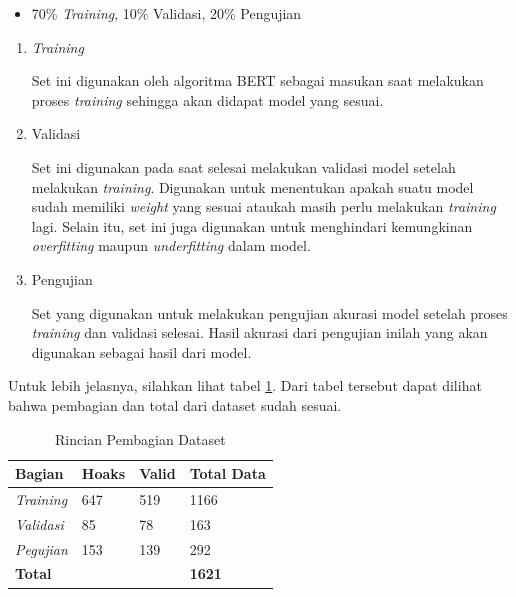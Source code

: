 \begin{itemize}
    \item 70\% \textit{Training}, 10\% Validasi, 20\% Pengujian
\end{itemize}

\begin{enumerate}
    \item \textit{Training}

          Set ini digunakan oleh algoritma BERT sebagai masukan saat melakukan proses \textit{training} sehingga akan didapat model yang sesuai.

    \item Validasi

          Set ini digunakan pada saat selesai melakukan validasi model setelah melakukan \textit{training}. Digunakan untuk menentukan apakah suatu model sudah memiliki \textit{weight} yang sesuai ataukah masih perlu melakukan \textit{training} lagi. Selain itu, set ini juga digunakan untuk menghindari kemungkinan \textit{overfitting} maupun \textit{underfitting} dalam model.

    \item Pengujian

          Set yang digunakan untuk melakukan pengujian akurasi model setelah proses \textit{training} dan validasi selesai. Hasil akurasi dari pengujian inilah yang akan digunakan sebagai hasil dari model.

\end{enumerate}

Untuk lebih jelasnya, silahkan lihat tabel \ref{tab:dataset_section}. Dari tabel tersebut dapat dilihat bahwa pembagian dan total dari dataset sudah sesuai.

\begin{table}[h]
    \caption{Rincian Pembagian Dataset}
    \label{tab:dataset_section}
    \centering
    \begin{tabular}{ | l | l | l | l | }
        \hline
        \textbf{Bagian}                      & \textbf{Hoaks} & \textbf{Valid} & \textbf{Total Data} \\ \hline
        \textit{Training}                    & 647            & 519            & 1166                \\ \hline
        \textit{Validasi}                    & 85             & 78             & 163                 \\ \hline
        \textit{Pegujian}                    & 153            & 139            & 292                 \\ \hline
        \multicolumn{3}{|l|}{\textbf{Total}} & \textbf{1621}                                         \\ \hline
    \end{tabular}
\end{table}

